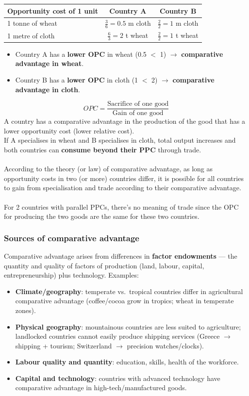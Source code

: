 \begin{center}
\begin{tabular}{lcc}
\toprule
\textbf{Opportunity cost of 1 unit} & \textbf{Country A} & \textbf{Country B} \\
\midrule
1 tonne of wheat & $\frac{3}{6} = 0.5$ m cloth & $\frac{2}{2} = 1$ m cloth \\
1 metre of cloth & $\frac{6}{3} = 2$ t wheat & $\frac{2}{2} = 1$ t wheat \\
\bottomrule
\end{tabular}
\end{center}
\begin{itemize}
  \item Country A has a \textbf{lower OPC} in wheat (0.5 $<$ 1) $\to$ \textbf{comparative advantage in wheat}.
  \item Country B has a \textbf{lower OPC} in cloth (1 $<$ 2) $\to$ \textbf{comparative advantage in cloth}.
\end{itemize}
\[OPC=\dfrac{\text{Sacrifice of one good}}{\text{Gain of one good}}\]
A country has a comparative advantage in the production of the good that has a lower opportunity cost (lower relative cost). \\
If A specialises in wheat and B specialises in cloth, total output increases and both countries can \textbf{consume beyond their PPC} through trade. \\\\
According to the theory (or law) of comparative advantage, as long as opportunity costs in two (or more) countries differ, it is possible for all countries to gain from specialisation and trade according to their comparative advantage. \\\\
For 2 countries with parallel PPCs, there's no meaning of trade since the OPC for producing the two goods are the same for these two countries.
\subsubsection*{Sources of comparative advantage}
Comparative advantage arises from differences in \textbf{factor endowments} --- the quantity and quality of factors of production (land, labour, capital, entrepreneurship) plus technology. Examples:
\begin{itemize}
  \item \textbf{Climate/geography}: temperate vs.\ tropical countries differ in agricultural comparative advantage (coffee/cocoa grow in tropics; wheat in temperate zones).
  \item \textbf{Physical geography}: mountainous countries are less suited to agriculture; landlocked countries cannot easily produce shipping services (Greece $\to$ shipping + tourism; Switzerland $\to$ precision watches/clocks).
  \item \textbf{Labour quality and quantity}: education, skills, health of the workforce.
  \item \textbf{Capital and technology}: countries with advanced technology have comparative advantage in high-tech/manufactured goods.
\end{itemize}

